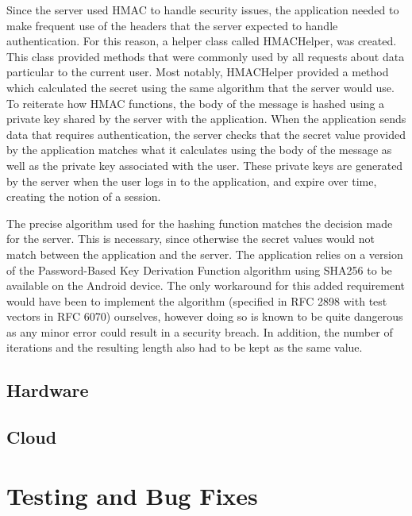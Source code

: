 \documentclass[12pt]{report}
\begin{document}
Since the server used HMAC to handle security issues, the application needed to make frequent use of the headers that
the server expected to handle authentication. For this reason, a helper class called HMACHelper, was created. This
class provided methods that were commonly used by all requests about data particular to the current user. Most notably,
HMACHelper provided a method which calculated the secret using the same algorithm that the server would use. To
reiterate how HMAC functions, the body of the message is hashed using a private key shared by the server with the
application. When the application sends data that requires authentication, the server checks that the secret value
provided by the application matches what it calculates using the body of the message as well as the private key
associated with the user. These private keys are generated by the server when the user logs in to the application,
and expire over time, creating the notion of a session.

The precise algorithm used for the hashing function matches the decision made for the server. This is necessary, since
otherwise the secret values would not match between the application and the server. The application relies on a version
of the Password-Based Key Derivation Function algorithm using SHA256 to be available on the Android device. The only
workaround for this added requirement would have been to implement the algorithm (specified in RFC 2898 with test
vectors in RFC 6070) ourselves, however doing so is known to be quite dangerous as any minor error could result in a
security breach. In addition, the number of iterations and the resulting length also had to be kept as the same value.


\section{Hardware}


\section{Cloud}


\chapter{Testing and Bug Fixes}
\end{document}
